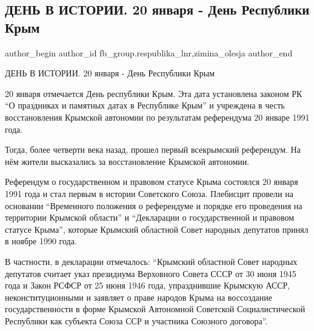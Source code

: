 
 
 
 
 
 
\subsection{ДЕНЬ В ИСТОРИИ. 20 января - День Республики Крым}
\label{sec:20_01_2022.fb.fb_group.respublika_lnr.2.den_respubliki_krym}
 
\ifcmt
 author_begin
   author_id fb_group.respublika_lnr,zimina_olesja
 author_end
\fi

ДЕНЬ В ИСТОРИИ. 20 января - День Республики Крым

20 января отмечается День республики Крым. Эта дата установлена законом РК \enquote{О
праздниках и памятных датах в Республике Крым} и учреждена в честь
восстановления Крымской автономии по результатам референдума 20 январе 1991
года.

Тогда, более четверти века назад, прошел первый всекрымский референдум. На нём
жители высказались за восстановление Крымской автономии.

Референдум о государственном и правовом статусе Крыма состоялся 20 января 1991
года и стал первым в истории Советского Союза. Плебисцит провели на основании
\enquote{Временного положения о референдуме и порядке его проведения на территории
Крымской области} и \enquote{Декларации о государственной и правовом статусе Крыма},
которые Крымский областной Совет народных депутатов принял в ноябре 1990 года.

В частности, в декларации отмечалось: \enquote{Крымский областной Совет народных
депутатов считает указ президиума Верховного Совета СССР от 30 июня 1945 года и
Закон РСФСР от 25 июня 1946 года, упразднившие Крымскую АССР,
неконституционными и заявляет о праве народов Крыма на воссоздание
государственности в форме Крымской Автономной Советской Социалистической
Республики как субъекта Союза ССР и участника Союзного договора}.

